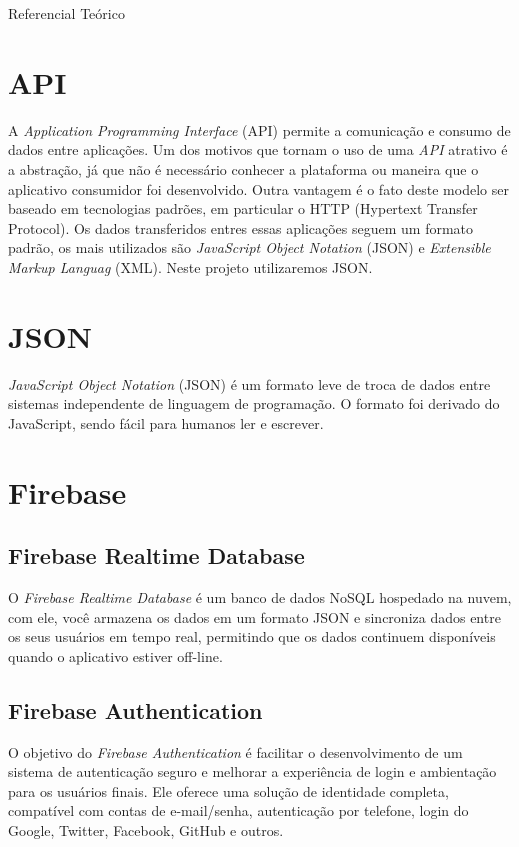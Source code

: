 \documentclass[
	12pt,				%
	openright,			%
	twoside,			%
	a4paper,			%
	english,			%
	french,				%
	spanish,			%
	brazil				%
	]{abntex2}
\begin{document}
\begin{chapter}{Referencial Teórico}
\section{API}
A \textit{Application Programming Interface} (API) permite a comunicação e consumo de dados entre aplicações. Um dos motivos que tornam o uso de uma \textit{API} atrativo é a abstração, já que não é necessário conhecer a plataforma ou maneira que o aplicativo consumidor foi desenvolvido. Outra vantagem é o fato deste modelo ser baseado em tecnologias padrões, em particular o HTTP (Hypertext Transfer Protocol). Os dados transferidos entres essas aplicações seguem um formato padrão, os mais utilizados são \textit{JavaScript Object Notation} (JSON) e \textit{Extensible Markup Languag} (XML). Neste projeto utilizaremos JSON.

\section{JSON}
\textit{JavaScript Object Notation} (JSON) é um formato leve de troca de dados entre sistemas independente de linguagem de programação. O formato foi derivado do JavaScript, sendo fácil para humanos ler e escrever.

\section{Firebase}
\subsection{Firebase Realtime Database}
O \textit{Firebase Realtime Database} é um banco de dados NoSQL hospedado na nuvem, com ele, você armazena os dados em um formato JSON e sincroniza dados entre os seus usuários em tempo real, permitindo que os dados continuem disponíveis quando o aplicativo estiver off-line.

\subsection{Firebase Authentication}
O objetivo do \textit{Firebase Authentication} é facilitar o desenvolvimento de um sistema de autenticação seguro e melhorar a experiência de login e ambientação para os usuários finais. Ele oferece uma solução de identidade completa, compatível com contas de e-mail/senha, autenticação por telefone, login do Google, Twitter, Facebook, GitHub e outros.

\end{chapter}
\end{document}

